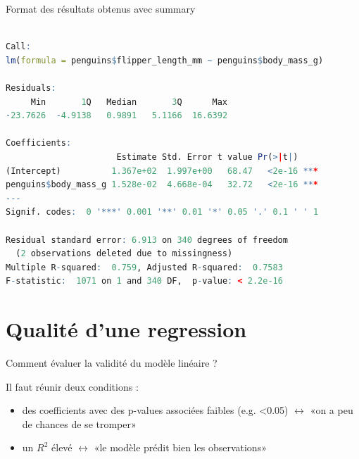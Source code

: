 \documentclass{beamer}
\begin{document}
\begin{frame}[fragile]{Format des résultats obtenus avec summary}



\begin{tiny}
\begin{spacing}{0.75}
\begin{lstlisting}[language=R,basicstyle=\scriptsize\ttfamily, commentstyle=\ttfamily]

Call:
lm(formula = penguins$flipper_length_mm ~ penguins$body_mass_g)

Residuals:
     Min       1Q   Median       3Q      Max 
-23.7626  -4.9138   0.9891   5.1166  16.6392 

Coefficients:
                      Estimate Std. Error t value Pr(>|t|)    
(Intercept)          1.367e+02  1.997e+00   68.47   <2e-16 ***
penguins$body_mass_g 1.528e-02  4.668e-04   32.72   <2e-16 ***
---
Signif. codes:  0 '***' 0.001 '**' 0.01 '*' 0.05 '.' 0.1 ' ' 1

Residual standard error: 6.913 on 340 degrees of freedom
  (2 observations deleted due to missingness)
Multiple R-squared:  0.759,	Adjusted R-squared:  0.7583 
F-statistic:  1071 on 1 and 340 DF,  p-value: < 2.2e-16
\end{lstlisting}
\end{spacing}
\end{tiny}


\end{frame}

\section{Qualité d'une regression}


\begin{frame}{Comment évaluer la validité du modèle linéaire  ?}

Il faut réunir deux conditions : 

\begin{itemize}
\item des coefficients avec des \alert{p-values} associées \alert{faibles} (e.g. <0.05)  $\leftrightarrow$ «on a peu de chances de se tromper»
\item un $R^2$ élevé  $\leftrightarrow$ «le modèle prédit bien les observations»
\end{itemize}


\end{frame}
\end{document}
